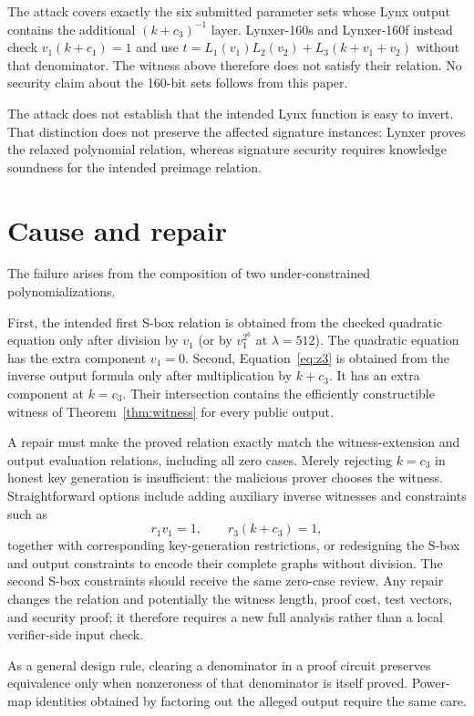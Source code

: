 \documentclass[11pt,a4paper]{article}
\begin{document}
The attack covers exactly the six submitted parameter sets whose Lynx output contains the
additional $(k+c_3)^{-1}$ layer.  Lynxer-160s and Lynxer-160f instead check
$v_1(k+c_1)=1$ and use $t=L_1(v_1)L_2(v_2)+L_3(k+v_1+v_2)$ without that denominator.
The witness above therefore does not satisfy their relation.  No security claim about the
160-bit sets follows from this paper.

The attack does not establish that the intended Lynx function is easy to invert.  That
distinction does not preserve the affected signature instances: Lynxer proves the relaxed
polynomial relation, whereas signature security requires knowledge soundness for the intended
preimage relation.

\section{Cause and repair}

The failure arises from the composition of two under-constrained polynomializations.

First, the intended first S-box relation is obtained from the checked quadratic equation only
after division by $v_1$ (or by $v_1^{2^6}$ at $\lambda=512$).  The quadratic equation has the
extra component $v_1=0$.  Second, Equation~\eqref{eq:z3} is obtained from the inverse output
formula only after multiplication by $k+c_3$.  It has an extra component at $k=c_3$.
Their intersection contains the efficiently constructible witness of
Theorem~\ref{thm:witness} for every public output.

A repair must make the proved relation exactly match the witness-extension and output
evaluation relations, including all zero cases.  Merely rejecting $k=c_3$ in honest key generation is insufficient:
the malicious prover chooses the witness.  Straightforward options include adding auxiliary
inverse witnesses and constraints such as
\[
   r_1v_1=1,\qquad r_3(k+c_3)=1,
\]
together with corresponding key-generation restrictions, or redesigning the S-box and output
constraints to encode their complete graphs without division.  The second S-box constraints
should receive the same zero-case review.  Any repair changes the relation and potentially the
witness length, proof cost, test vectors, and security proof; it therefore requires a new full
analysis rather than a local verifier-side input check.

As a general design rule, clearing a denominator in a proof circuit preserves equivalence
only when nonzeroness of that denominator is itself proved.  Power-map identities obtained by
factoring out the alleged output require the same care.
\end{document}
